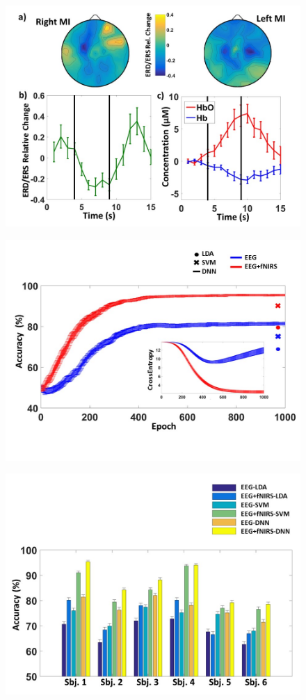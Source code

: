 \documentclass[12pt ]{iopart}
\begin{document}
\begin{figure}
	\includegraphics[width=\linewidth]{Slide4.JPG}
	\caption{}
	\label{fig:fig4}
\end{figure}
\begin{figure}
	\includegraphics[width=\linewidth]{Slide5.JPG}
	\caption{}
	\label{fig:fig5}
\end{figure}
\begin{figure}
	\includegraphics[width=\linewidth]{Slide6.JPG}
	\caption{}
	\label{fig:fig6}
\end{figure}
\end{document}
